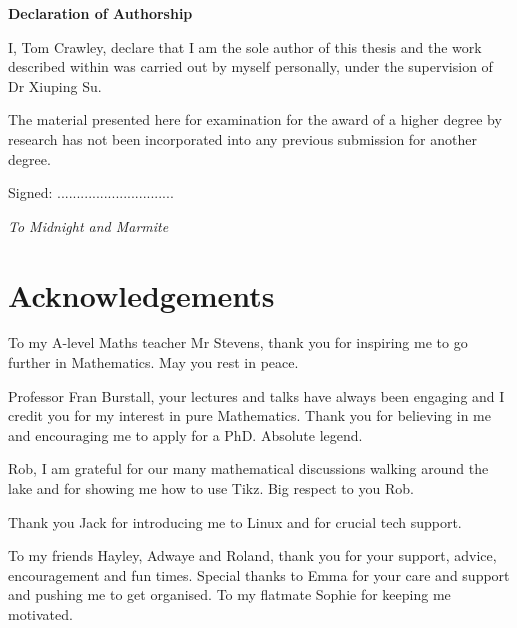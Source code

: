 \documentclass[a4paper, 11pt, twoside]{report}
\begin{document}

\afterpage{\blankpage}

\clearpage
\thispagestyle{empty}
\vspace*{\fill}
\begin{center}
\textbf{Declaration of Authorship}
\end{center}
I, Tom Crawley, declare that I am the sole author of this thesis and the work described within was carried out by myself personally, under the supervision of Dr Xiuping Su.

The material presented here for examination for the award of a higher degree by research has not been incorporated into any previous submission for another degree.
\vspace{0.7cm}
\begin{center}
Signed: ..............................
\end{center}
\vspace*{\fill}
\afterpage{\blankpage} 

\clearpage
\thispagestyle{empty}
\vspace*{\fill}
\begin{center}
\Large
\emph{To Midnight and Marmite}
\vspace*{\fill}
\end{center}
\normalsize
\afterpage{\blankpage}


\chapter*{\centering Acknowledgements}

To my A-level Maths teacher Mr Stevens, thank you for inspiring me to go further in Mathematics. May you rest in peace.

Professor Fran Burstall, your lectures and talks have always been engaging and I credit you for my interest in pure Mathematics. Thank you for believing in me and encouraging me to apply for a PhD. Absolute legend.

Rob, I am grateful for our many mathematical discussions walking around the lake and for showing me how to use Tikz. Big respect to you Rob.

Thank you Jack for introducing me to Linux and for crucial tech support.

To my friends Hayley, Adwaye and Roland, thank you for your support, advice, encouragement and fun times. Special thanks to Emma for your care and support and pushing me to get organised. To my flatmate Sophie for keeping me motivated.
\end{document}
